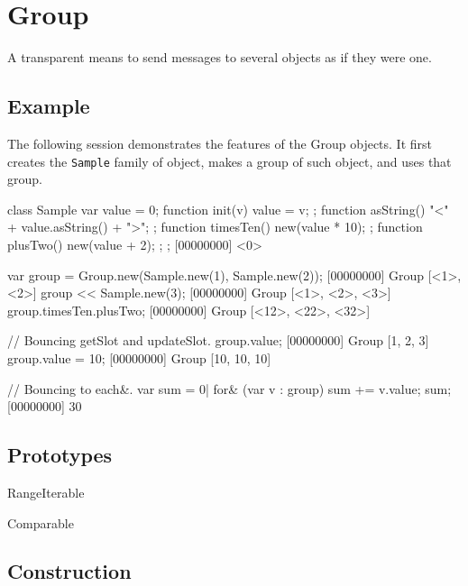 
\section{Group}
A transparent means to send messages to several objects as if they
were one.

\subsection{Example}

The following session demonstrates the features of the Group
objects.  It first creates the \lstinline|Sample| family of object,
makes a group of such object, and uses that group.

\begin{urbiscript}[firstnumber=1]
class Sample
{
  var value = 0;
  function init(v)    { value = v; };
  function asString() { "<" + value.asString() + ">"; };
  function timesTen() { new(value * 10); };
  function plusTwo()  { new(value + 2); };
};
[00000000] <0>

var group = Group.new(Sample.new(1), Sample.new(2));
[00000000] Group [<1>, <2>]
group << Sample.new(3);
[00000000] Group [<1>, <2>, <3>]
group.timesTen.plusTwo;
[00000000] Group [<12>, <22>, <32>]

// Bouncing getSlot and updateSlot.
group.value;
[00000000] Group [1, 2, 3]
group.value = 10;
[00000000] Group [10, 10, 10]

// Bouncing to each&.
var sum = 0|
for& (var v : group)
  sum += v.value;
sum;
[00000000] 30
\end{urbiscript}

\subsection{Prototypes}

\begin{refObjects}
\item[RangeIterable]
\item[Comparable]
\end{refObjects}

\subsection{Construction}

